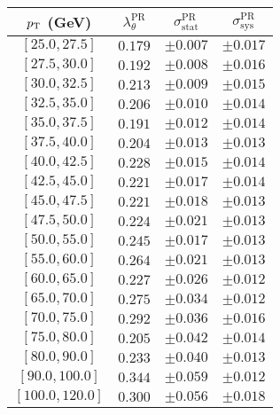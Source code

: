 \begin{tabular}{c||c||c|c}
$p_\text{T}$ (GeV) & $\lambda_\theta^{\text{PR}}$ & $\sigma_{\text{stat}}^{\text{PR}}$ & $\sigma_{\text{sys}}^{\text{PR}}$  \\
\hline
$[25.0, 27.5]$& $0.179$ & $\pm0.007$ & $\pm0.017$\\
$[27.5, 30.0]$& $0.192$ & $\pm0.008$ & $\pm0.016$\\
$[30.0, 32.5]$& $0.213$ & $\pm0.009$ & $\pm0.015$\\
$[32.5, 35.0]$& $0.206$ & $\pm0.010$ & $\pm0.014$\\
$[35.0, 37.5]$& $0.191$ & $\pm0.012$ & $\pm0.014$\\
$[37.5, 40.0]$& $0.204$ & $\pm0.013$ & $\pm0.013$\\
$[40.0, 42.5]$& $0.228$ & $\pm0.015$ & $\pm0.014$\\
$[42.5, 45.0]$& $0.221$ & $\pm0.017$ & $\pm0.014$\\
$[45.0, 47.5]$& $0.221$ & $\pm0.018$ & $\pm0.013$\\
$[47.5, 50.0]$& $0.224$ & $\pm0.021$ & $\pm0.013$\\
$[50.0, 55.0]$& $0.245$ & $\pm0.017$ & $\pm0.013$\\
$[55.0, 60.0]$& $0.264$ & $\pm0.021$ & $\pm0.013$\\
$[60.0, 65.0]$& $0.227$ & $\pm0.026$ & $\pm0.012$\\
$[65.0, 70.0]$& $0.275$ & $\pm0.034$ & $\pm0.012$\\
$[70.0, 75.0]$& $0.292$ & $\pm0.036$ & $\pm0.016$\\
$[75.0, 80.0]$& $0.205$ & $\pm0.042$ & $\pm0.014$\\
$[80.0, 90.0]$& $0.233$ & $\pm0.040$ & $\pm0.013$\\
$[90.0, 100.0]$& $0.344$ & $\pm0.059$ & $\pm0.012$\\
$[100.0, 120.0]$& $0.300$ & $\pm0.056$ & $\pm0.018$\\
\end{tabular}

